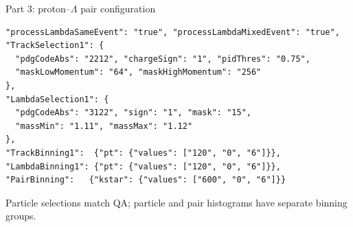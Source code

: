 \begin{frame}[fragile]{Part 3: proton--$\Lambda$ pair configuration}
 \begin{lstlisting}
"processLambdaSameEvent": "true", "processLambdaMixedEvent": "true",
"TrackSelection1": {
  "pdgCodeAbs": "2212", "chargeSign": "1", "pidThres": "0.75",
  "maskLowMomentum": "64", "maskHighMomentum": "256"
},
"LambdaSelection1": {
  "pdgCodeAbs": "3122", "sign": "1", "mask": "15",
  "massMin": "1.11", "massMax": "1.12"
},
"TrackBinning1":  {"pt": {"values": ["120", "0", "6"]}},
"LambdaBinning1": {"pt": {"values": ["120", "0", "6"]}},
"PairBinning":   {"kstar": {"values": ["600", "0", "6"]}}
 \end{lstlisting}
 \small Particle selections match QA; particle and pair histograms have separate binning groups.
\end{frame}

